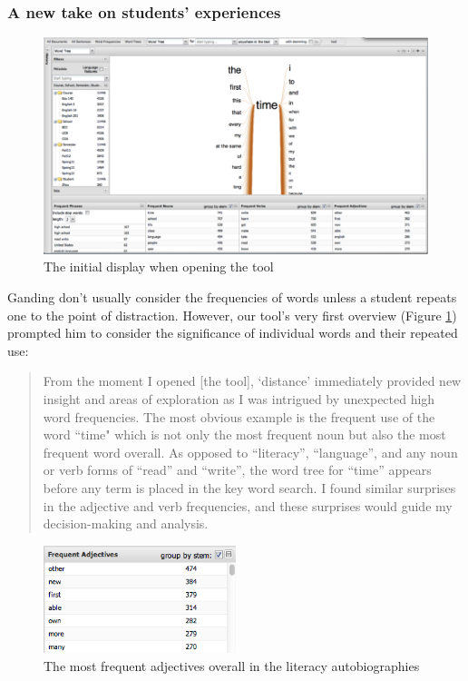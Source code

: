 \documentclass{sig-alternate}
\begin{document}
 \subsubsection{A new take on students' experiences}

\begin{figure}
\includegraphics[width=\textwidth]{fig/rex/01.png}
\caption{The initial display when opening the tool \label{fig:rex01}}
\end{figure}

Ganding don't usually consider the frequencies of words unless a student repeats one to the point of distraction. However, our tool's very first overview (Figure \ref{fig:rex01}) prompted him to consider the significance of individual words and their repeated use:
\begin{quote}
From the moment I opened [the tool], `distance' immediately provided new insight and areas of exploration as I was intrigued by unexpected high word frequencies.  The most obvious example is the frequent use of the word ``time" which is not only the most frequent noun but also the most frequent word overall.  As opposed to ``literacy'', ``language'', and any noun or verb forms of ``read'' and ``write'', the word tree for ``time'' appears before any term is placed in the key word search.   I found similar surprises in the adjective and verb frequencies, and these surprises would guide my decision-making and analysis.
\end{quote}

\begin{figure}
\includegraphics[width=0.5\textwidth]{fig/rex/02.png}
\caption{The most frequent adjectives overall in the literacy autobiographies \label{fig:rex02}}
\end{figure}
\end{document}
